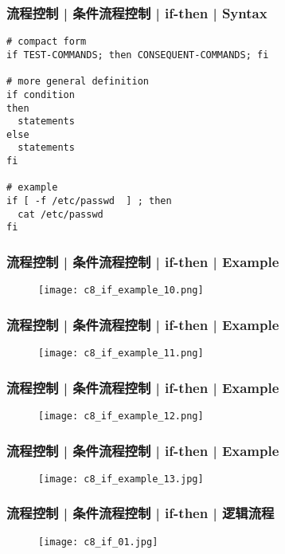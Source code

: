 \begin{frame}[fragile]
  \frametitle{流程控制 | 条件流程控制 | if-then | Syntax}
  \vspace{-0.5em}
\begin{lstlisting}
# compact form
if TEST-COMMANDS; then CONSEQUENT-COMMANDS; fi

# more general definition
if condition
then
  statements
else
  statements
fi

# example
if [ -f /etc/passwd  ] ; then
  cat /etc/passwd
fi
\end{lstlisting}
\end{frame}

\begin{frame}
  \frametitle{流程控制 | 条件流程控制 | if-then | Example}
  \begin{figure}
    \centering
    \texttt{[image: c8\_if\_example\_10.png]}
  \end{figure}
\end{frame}

\begin{frame}
  \frametitle{流程控制 | 条件流程控制 | if-then | Example}
  \begin{figure}
    \centering
    \texttt{[image: c8\_if\_example\_11.png]}
  \end{figure}
\end{frame}

\begin{frame}
  \frametitle{流程控制 | 条件流程控制 | if-then | Example}
  \begin{figure}
    \centering
    \texttt{[image: c8\_if\_example\_12.png]}
  \end{figure}
\end{frame}

\begin{frame}
  \frametitle{流程控制 | 条件流程控制 | if-then | Example}
  \begin{figure}
    \centering
    \texttt{[image: c8\_if\_example\_13.jpg]}
  \end{figure}
\end{frame}

\begin{frame}
  \frametitle{流程控制 | 条件流程控制 | if-then | 逻辑流程}
  \begin{figure}
    \centering
    \texttt{[image: c8\_if\_01.jpg]}
  \end{figure}
\end{frame}

